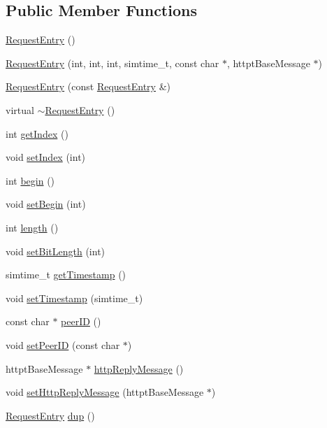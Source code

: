 \subsection*{Public Member Functions}
\begin{DoxyCompactItemize}
\item 
\hyperlink{classRequestEntry_a95d45a84e3e25909c5b065450bad4aad}{Request\+Entry} ()
\item 
\hyperlink{classRequestEntry_a69b1396e2e503cc704a3cf9157ca24e8}{Request\+Entry} (int, int, int, simtime\+\_\+t, const char $\ast$, httpt\+Base\+Message $\ast$)
\item 
\hyperlink{classRequestEntry_a85528d356b3ee23388b0297accb7fd12}{Request\+Entry} (const \hyperlink{classRequestEntry}{Request\+Entry} \&)
\item 
virtual \hyperlink{classRequestEntry_ab26a3ee47c31028f6771ed54e66fae28}{$\sim$\+Request\+Entry} ()
\item 
int \hyperlink{classRequestEntry_afb1e573d37bbf1cce5b20b6162c595c8}{get\+Index} ()
\item 
void \hyperlink{classRequestEntry_abe544acc9da02db6c8d4f35464097167}{set\+Index} (int)
\item 
int \hyperlink{classRequestEntry_afc8ad0d9147c91db24dcf92806d8e936}{begin} ()
\item 
void \hyperlink{classRequestEntry_a97d3640f9e93745f8356865e69a1bb48}{set\+Begin} (int)
\item 
int \hyperlink{classRequestEntry_a74e4135e2270898733bf8f0c5fcae8da}{length} ()
\item 
void \hyperlink{classRequestEntry_aacf772652f33c8dc3c8655dc3bb02c85}{set\+Bit\+Length} (int)
\item 
simtime\+\_\+t \hyperlink{classRequestEntry_a71cec14c796056ae048e669617239a40}{get\+Timestamp} ()
\item 
void \hyperlink{classRequestEntry_a89e2cf2af0520908c2f778eeba4ca8a4}{set\+Timestamp} (simtime\+\_\+t)
\item 
const char $\ast$ \hyperlink{classRequestEntry_a469a3d7a9242f3cbc3b9a5279782045a}{peer\+I\+D} ()
\item 
void \hyperlink{classRequestEntry_ad3a725cd00fd5e86db33a490fdfdc860}{set\+Peer\+I\+D} (const char $\ast$)
\item 
httpt\+Base\+Message $\ast$ \hyperlink{classRequestEntry_aa78d3b3d332bc540fd949a572a6b0252}{http\+Reply\+Message} ()
\item 
void \hyperlink{classRequestEntry_a5fa7c81c38d3a96918784090d73112c8}{set\+Http\+Reply\+Message} (httpt\+Base\+Message $\ast$)
\item 
\hyperlink{classRequestEntry}{Request\+Entry} \hyperlink{classRequestEntry_ad783916b2da98cd5e2e7cfea32eb72f6}{dup} ()
\end{DoxyCompactItemize}
